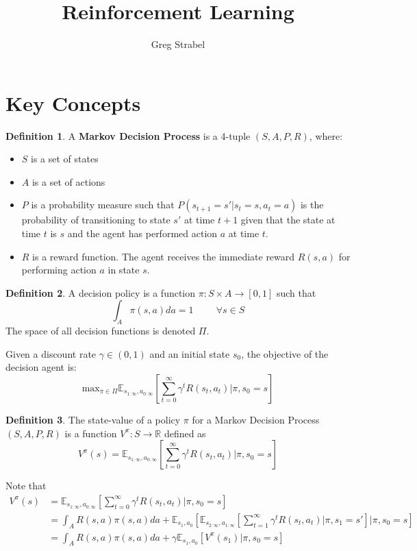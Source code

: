 \documentclass[11pt]{article}
\author{Greg Strabel}
\title{Reinforcement Learning}
\theoremstyle{definition}
\newtheorem{definition}{Definition}[section]
\begin{document}
\maketitle
\section{Key Concepts}
\begin{definition} A \textbf{Markov Decision Process} is a 4-tuple $(S,A,P,R)$, where:
\begin{itemize}
\item $S$ is a set of states
\item $A$ is a set of actions
\item $P$ is a probability measure such that $P(s_{t+1}=s'| s_t=s, a_t=a)$ is the probability of transitioning to state $s'$ at time $t+1$ given that the state at time $t$ is $s$ and the agent has performed action $a$ at time $t$.
\item $R$ is a reward function. The agent receives the immediate reward $R(s,a)$ for performing action $a$ in state $s$. 
\end{itemize}
\end{definition}
\begin{definition} A decision policy is a function $\pi : S \times A \rightarrow [0,1]$ such that
\begin{equation}
\int_A \pi(s,a)da=1 \hspace{1cm} \forall s\in S
\end{equation}
The space of all decision functions is denoted $\Pi$.
\end{definition}
Given a discount rate $\gamma \in (0,1)$ and an initial state $s_0$, the objective of the decision agent is:
\begin{equation}
\mathrm{max}_{\pi \in \Pi} \mathbb{E}_{s_{1:\infty},a_{0:\infty}} \left[ \sum_{t=0}^{\infty} \gamma^t R(s_t, a_t) | \pi, s_0 = s \right]
\end{equation}
\begin{definition} The state-value of a policy $\pi$ for a Markov Decision Process $(S,A,P,R)$ is a function $V^{\pi} : S \rightarrow \mathbb{R}$ defined as
\begin{equation}
V^{\pi}(s) = \mathbb{E}_{s_{1:\infty},a_{0:\infty}} \left[ \sum_{t=0}^{\infty} \gamma^t R(s_t, a_t) | \pi, s_0 = s \right]
\end{equation}
\end{definition}
Note that
\begin{equation}
\begin{split}
V^{\pi}(s) &= \mathbb{E}_{s_{1:\infty},a_{0:\infty}} \left[ \sum_{t=0}^{\infty} \gamma^t R(s_t, a_t) | \pi, s_0 = s \right] \\
&= \int_A R(s,a) \pi (s,a) da + \mathbb{E}_{s_1,a_0} \left[ \mathbb{E}_{s_{2:\infty},a_{1:\infty}} \left[ \sum_{t=1}^{\infty} \gamma^t R(s_t, a_t) | \pi, s_1 = s' \right] | \pi, s_0 = s \right] \\
&= \int_A R(s,a) \pi (s,a) da + \gamma \mathbb{E}_{s_1,a_0} \left[ V^{\pi}(s_1) | \pi, s_0 = s \right]
\end{split}
\end{equation}
\end{document}
